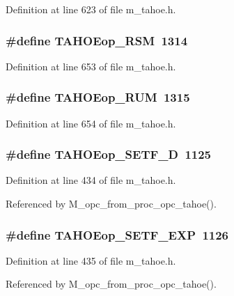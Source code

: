 Definition at line 623 of file m\_\-tahoe.h.
\subsubsection{\setlength{\rightskip}{0pt plus 5cm}\#define TAHOEop\_\-RSM~1314}\label{m__tahoe_8h_1dbcc294e76829ac1f9de8979ab425d5}




Definition at line 653 of file m\_\-tahoe.h.
\subsubsection{\setlength{\rightskip}{0pt plus 5cm}\#define TAHOEop\_\-RUM~1315}\label{m__tahoe_8h_c0fb7651a4c3d1e3027781c7e6511fac}




Definition at line 654 of file m\_\-tahoe.h.
\subsubsection{\setlength{\rightskip}{0pt plus 5cm}\#define TAHOEop\_\-SETF\_\-D~1125}\label{m__tahoe_8h_ce3b1702deef65895bc6f5dad119b885}




Definition at line 434 of file m\_\-tahoe.h.

Referenced by M\_\-opc\_\-from\_\-proc\_\-opc\_\-tahoe().
\subsubsection{\setlength{\rightskip}{0pt plus 5cm}\#define TAHOEop\_\-SETF\_\-EXP~1126}\label{m__tahoe_8h_784b9d3fb5d72701c7871d8a30e67961}




Definition at line 435 of file m\_\-tahoe.h.

Referenced by M\_\-opc\_\-from\_\-proc\_\-opc\_\-tahoe().
